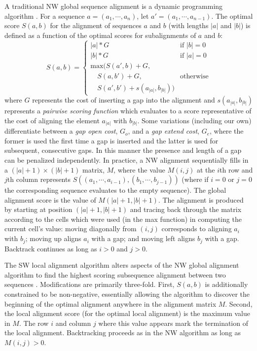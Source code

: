 \documentclass[phd,electronic,oneside,twosidetoc,letterpaper,chaptercenter,parttop,lof,lot]{byumsphd}
\begin{document}
A traditional NW global sequence alignment is a dynamic programming algorithm \cite{needleman1970general}. For a sequence $a = (a_1,\cdots,a_n)$, let $a'=(a_1,\cdots,a_{n-1})$. The optimal score $S(a,b)$ for the alignment of sequences $a$ and $b$ (with lengths $|a|$ and $|b|$) is defined as a function of the optimal scores for subalignments of $a$ and $b$:
\[
S(a,b) =
\begin{cases}
|a| * G & \text{if } |b| = 0 \\
|b| * G & \text{if } |a| = 0 \\
\text{max}(S(a',b) + G, \\
\quad S(a,b') + G, & \text{otherwise} \\
\quad S(a',b') + s(a_{|a|},b_{|b|}))
\end{cases}
\]
\noindent where $G$ represents the cost of inserting a gap into the alignment and $s(a_{|a|},b_{|b|})$ represents a \textit{pairwise scoring function} which evaluates to a score representative of the cost of aligning the element $a_{|a|}$ with $b_{|b|}$. Some variations (including our own) differentiate between a \textit{gap open cost}, $G_o$, and a \textit{gap extend cost}, $G_e$, where the former is used the first time a gap is inserted and the latter is used for subsequent, consecutive gaps. In this manner the presence and length of a gap can be penalized independently. In practice, a NW alignment sequentially fills in a $(|a|+1)\times(|b|+1)$ matrix, $M$, where the value $M(i,j)$ at the $i$th row and $j$th column represents $S((a_1,\cdots,a_{i-1}),(b_1,\cdots,b_{j-1}))$ (where if $i=0$ or $j=0$ the corresponding sequence evaluates to the empty sequence). The global alignment score is the value of $M(|a|+1,|b|+1)$. The alignment is produced by starting at position $(|a|+1,|b|+1)$ and tracing back through the matrix according to the cells which were used (in the max function) in computing the current cell's value: moving diagonally from $(i,j)$ corresponds to aligning $a_i$ with $b_j$; moving up aligns $a_i$ with a gap; and moving left aligns $b_j$ with a gap. Backtrack continues as long as $i>0$ and $j>0$. 

The SW local alignment algorithm alters aspects of the NW global alignment algorithm to find the highest scoring subsequence alignment between two sequences \cite{smith1981identification}. Modifications are primarily three-fold. First, $S(a,b)$ is additionally constrained to be non-negative, essentially allowing the algorithm to discover the beginning of the optimal alignment anywhere in the alignment matrix $M$. Second, the local alignment score (for the optimal local alignment) is the maximum value in $M$. The row $i$ and column $j$ where this value appears mark the termination of the local alignment. Backtracking proceeds as in the NW algorithm as long as $M(i,j) > 0$.
\end{document}
